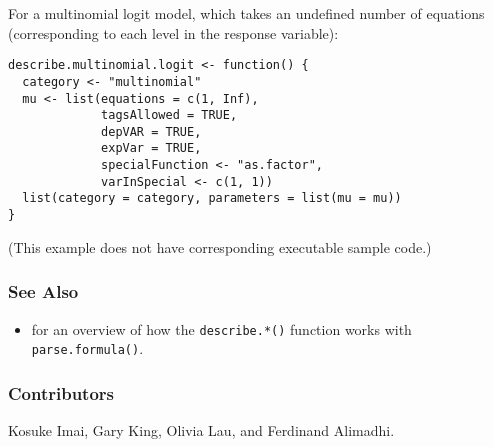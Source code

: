 For a multinomial logit model, which takes an undefined number of
equations (corresponding to each level in the response variable):  
\begin{verbatim}
describe.multinomial.logit <- function() { 
  category <- "multinomial"
  mu <- list(equations = c(1, Inf), 
             tagsAllowed = TRUE, 
             depVAR = TRUE, 
             expVar = TRUE, 
             specialFunction <- "as.factor", 
             varInSpecial <- c(1, 1))
  list(category = category, parameters = list(mu = mu))
}
\end{verbatim}
(This example does not have corresponding executable sample code.)

\subsubsection{See Also}
\begin{itemize}
\item {} for an overview of how the {\tt describe.*()}
function works with {\tt parse.formula()}.  
\end{itemize}

\subsubsection{Contributors}

Kosuke Imai, Gary King, Olivia Lau, and Ferdinand Alimadhi.

